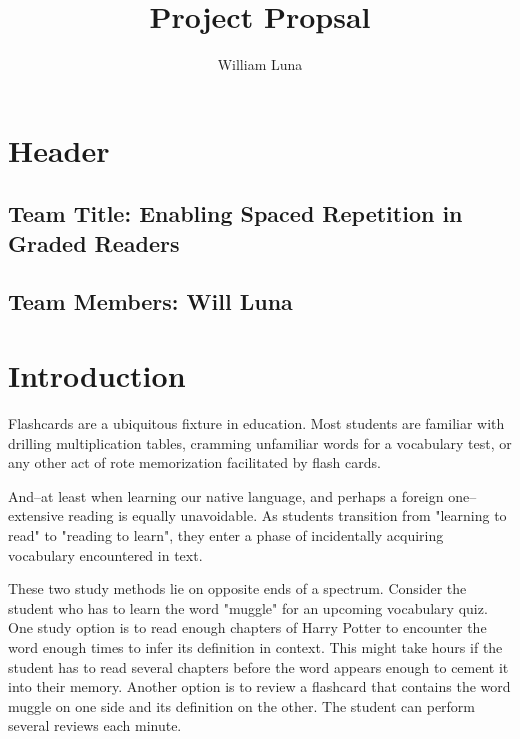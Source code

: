 \documentclass[
	letterpaper, %
]{jdf}
\author{William Luna}
\title{Project Propsal}
\begin{document}

\maketitle
\section{Header}
\subsection{Team Title: Enabling Spaced Repetition in Graded Readers}
\subsection{Team Members: Will Luna}

\section{Introduction}

Flashcards are a ubiquitous fixture in education. Most students are familiar with drilling multiplication tables, cramming unfamiliar words for a vocabulary test, or any other act of rote memorization facilitated by flash cards.

And–at least when learning our native language, and perhaps a foreign one–extensive reading is equally unavoidable. As students transition from "learning to read" to "reading to learn", they enter a phase of incidentally acquiring vocabulary encountered in text.

These two study methods lie on opposite ends of a spectrum. Consider the student who has to learn the word "muggle" for an upcoming vocabulary quiz. One study option is to read enough chapters of Harry Potter to encounter the word enough times to infer its definition in context. This might take hours if the student has to read several chapters before the word appears enough to cement it into their memory. Another option is to review a flashcard that contains the word muggle on one side and its definition on the other. The student can perform several reviews each minute.
\end{document}
